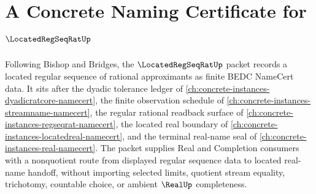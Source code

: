 \chapter{A Concrete Naming Certificate for $\LocatedRegSeqRatUp$}
\label{ch:concrete-instances-located-regseqrat-namecert}

Following Bishop and Bridges, the $\LocatedRegSeqRatUp$ packet records a located regular sequence of rational approximants as finite BEDC NameCert data. It sits after the dyadic tolerance ledger of \autoref{ch:concrete-instances-dyadicratcore-namecert}, the finite observation schedule of \autoref{ch:concrete-instances-streamname-namecert}, the regular rational readback surface of \autoref{ch:concrete-instances-regseqrat-namecert}, the located real boundary of \autoref{ch:concrete-instances-locatedreal-namecert}, and the terminal real-name seal of \autoref{ch:concrete-instances-real-namecert}. The packet supplies Real and Completion consumers with a nonquotient route from displayed regular sequence data to located real-name handoff, without importing selected limits, quotient stream equality, trichotomy, countable choice, or ambient $\RealUp$ completeness.

